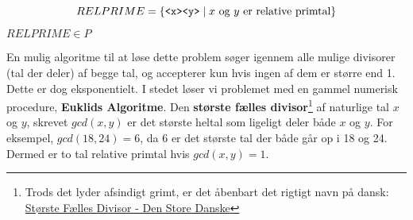 \begin{equation*}
	RELPRIME = \{\text{\texttt{<x><y>}} \mid x \text{ og } y \text{ er relative primtal}\}
\end{equation*}

\begin{theorem}
	$RELPRIME \in P$
\end{theorem}

En mulig algoritme til at løse dette problem søger igennem alle mulige divisorer (tal der deler) af begge tal, og accepterer kun hvis ingen af dem er større end 1. Dette er dog eksponentielt. I stedet løser vi problemet med en gammel numerisk procedure, \textbf{Euklids Algoritme}. Den \textbf{største fælles divisor}\footnote{Trods det lyder afsindigt grimt, er det åbenbart det rigtigt navn på dansk: \href{https://denstoredanske.lex.dk/st\%C3\%B8rste_f\%C3\%A6lles_divisor}{Største Fælles Divisor - Den Store Danske}} af naturlige tal $x$ og $y$, skrevet $gcd(x,y)$ er det største heltal som ligeligt deler både $x$ og $y$. For eksempel, $gcd(18,24) = 6$, da $6$ er det største tal der både går op i 18 og 24. Dermed er to tal relative primtal hvis $gcd(x,y) = 1$.

